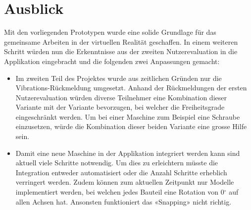 \chapter{Ausblick}
\label{ch:Ausblick}

Mit den vorliegenden Prototypen wurde eine solide Grundlage für das gemeinsame Arbeiten in der virtuellen Realität geschaffen. In einem weiteren Schritt würden nun die Erkenntnisse aus der zweiten Nutzerevaluation in die Applikation eingebracht und die folgenden zwei Anpassungen gemacht:

\begin{itemize}
	\item Im zweiten Teil des Projektes wurde aus zeitlichen Gründen nur die Vibrations-Rückmeldung umgesetzt. Anhand der Rückmeldungen der ersten Nutzerevaluation würden diverse Teilnehmer eine Kombination dieser Variante mit der Variante bevorzugen, bei welcher die Freiheitsgrade eingeschränkt werden. Um bei einer Maschine zum Beispiel eine Schraube einzusetzen, würde die Kombination dieser beiden Variante eine grosse Hilfe sein.
	
	\item Damit eine neue Maschine in der Applikation integriert werden kann sind aktuell viele Schritte notwendig. Um dies zu erleichtern müsste die Integration entweder automatisiert oder die Anzahl Schritte erheblich verringert werden. Zudem können zum aktuellen Zeitpunkt nur Modelle implementiert werden, bei welchen jedes Bauteil eine Rotation von 0$^{\circ}$ auf allen Achsen hat. Ansonsten funktioniert das «Snapping» nicht richtig.
\end{itemize}
